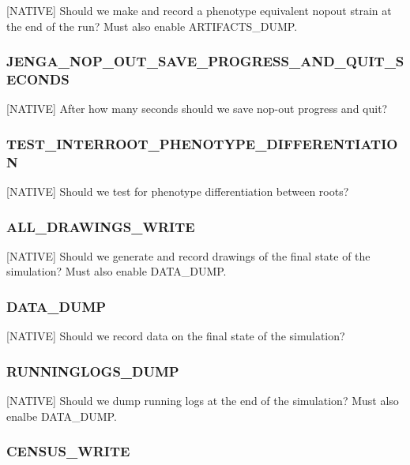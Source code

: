 
[NATIVE] Should we make and record a phenotype equivalent nopout strain at the end of the run? Must also enable ARTIFACTS\_DUMP.

\subsubsection{JENGA\_NOP\_OUT\_SAVE\_PROGRESS\_AND\_QUIT\_SECONDS}


[NATIVE] After how many seconds should we save nop-out progress and quit?

\subsubsection{TEST\_INTERROOT\_PHENOTYPE\_DIFFERENTIATION}


[NATIVE] Should we test for phenotype differentiation between roots?

\subsubsection{ALL\_DRAWINGS\_WRITE}


[NATIVE] Should we generate and record drawings of the final state of the simulation? Must also enable DATA_DUMP.

\subsubsection{DATA\_DUMP}


[NATIVE] Should we record data on the final state of the simulation?

\subsubsection{RUNNINGLOGS\_DUMP}


[NATIVE] Should we dump running logs at the end of the simulation? Must also enalbe DATA_DUMP.

\subsubsection{CENSUS\_WRITE}

